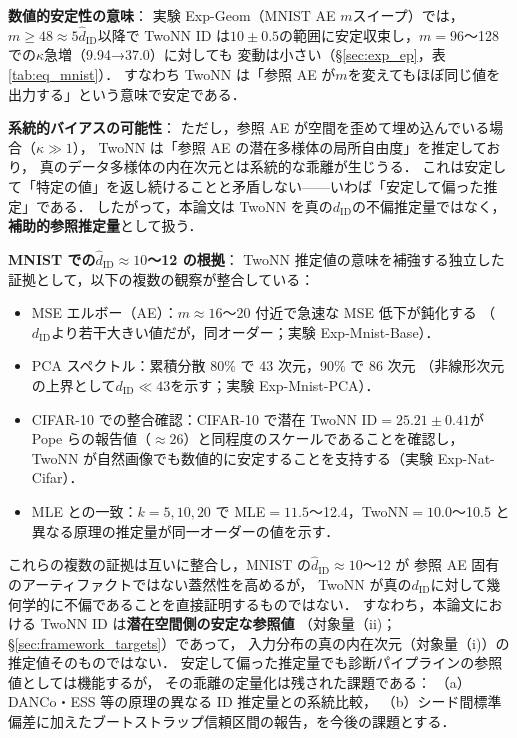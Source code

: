 \documentclass[11pt,a4paper]{jsarticle}
\begin{document}
\textbf{数値的安定性の意味}：
実験 Exp-Geom（MNIST AE $m$スイープ）では，$m \geq 48 \approx 5\hat{d}_\mathrm{ID}$以降で
TwoNN ID は$10 \pm 0.5$の範囲に安定収束し，$m = 96$〜128 での$\kappa$急増（9.94→37.0）に対しても
変動は小さい（§\ref{sec:exp_ep}，表\ref{tab:eq_mnist}）．
すなわち TwoNN は「参照 AE が$m$を変えてもほぼ同じ値を出力する」という意味で安定である．

\textbf{系統的バイアスの可能性}：
ただし，参照 AE が空間を歪めて埋め込んでいる場合（$\kappa \gg 1$），
TwoNN は「参照 AE の潜在多様体の局所自由度」を推定しており，
真のデータ多様体の内在次元とは系統的な乖離が生じうる．
これは安定して「特定の値」を返し続けることと矛盾しない——いわば「安定して偏った推定」である．
したがって，本論文は TwoNN を真の$d_\mathrm{ID}$の不偏推定量ではなく，
\textbf{補助的参照推定量}として扱う．

\textbf{MNIST での$\hat{d}_\mathrm{ID} \approx 10$〜12 の根拠}：
TwoNN 推定値の意味を補強する独立した証拠として，以下の複数の観察が整合している：
\begin{itemize}
  \item MSE エルボー（AE）：$m \approx 16$〜20 付近で急速な MSE 低下が鈍化する
        （$d_\mathrm{ID}$より若干大きい値だが，同オーダー；実験 Exp-Mnist-Base）．
  \item PCA スペクトル：累積分散 80\% で 43 次元，90\% で 86 次元
        （非線形次元の上界として$d_\mathrm{ID} \ll 43$を示す；実験 Exp-Mnist-PCA）．
  \item CIFAR-10 での整合確認：CIFAR-10 で潜在 TwoNN ID$=25.21\pm0.41$が
        Pope ら\cite{pope2021intrinsic}の報告値（$\approx26$）と同程度のスケールであることを確認し，
        TwoNN が自然画像でも数値的に安定することを支持する（実験 Exp-Nat-Cifar）．
  \item MLE との一致：$k=5,10,20$ で MLE$=11.5$〜12.4，TwoNN$=10.0$〜10.5 と
        異なる原理の推定量が同一オーダーの値を示す．
\end{itemize}
これらの複数の証拠は互いに整合し，MNIST の$\hat{d}_\mathrm{ID} \approx 10$〜12 が
参照 AE 固有のアーティファクトではない蓋然性を高めるが，
TwoNN が真の$d_\mathrm{ID}$に対して幾何学的に不偏であることを直接証明するものではない．
すなわち，本論文における TwoNN ID は\textbf{潜在空間側の安定な参照値}
（対象量（ii)；§\ref{sec:framework_targets}）であって，
入力分布の真の内在次元（対象量（i)）の推定値そのものではない．
安定して偏った推定量でも診断パイプラインの参照値としては機能するが，
その乖離の定量化は残された課題である：
（a）DANCo\cite{ceruti2014danco}・ESS 等の原理の異なる ID 推定量との系統比較，
（b）シード間標準偏差に加えたブートストラップ信頼区間の報告，を今後の課題とする．
\end{document}
